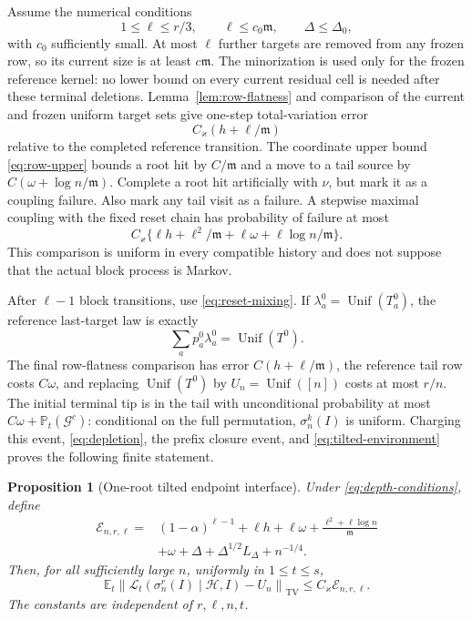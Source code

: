 \documentclass[11pt]{article}
\numberwithin{equation}{section}
\newtheorem{proposition}[theorem]{Proposition}
\theoremstyle{definition}
\theoremstyle{remark}
\newcommand{\E}{\mathbb E}
\newcommand{\Pp}{\mathbb P}
\newcommand{\TV}{\mathrm{TV}}
\newcommand{\Unif}{\operatorname{Unif}}
\newcommand{\cH}{\mathcal H}
\newcommand{\cG}{\mathcal G}
\newcommand{\mres}{\mathfrak m}
\newcommand{\norm}[1]{\left\|#1\right\|}
\begin{document}
Assume the numerical conditions
\begin{equation}\label{eq:depth-conditions}
 1\le\ell\le r/3,\qquad \ell\le c_0\mres,\qquad \Delta\le\Delta_0,
\end{equation}
with $c_0$ sufficiently small. At most $\ell$ further targets are removed
from any frozen row, so its current size is at least $c\mres$. The minorization
is used only for the frozen reference kernel: no lower bound on every current
residual cell is needed after these terminal deletions. Lemma~\ref{lem:row-flatness} and comparison of the current and frozen uniform target sets give one-step total-variation error
\[
 C_\varkappa(h+\ell/\mres)
\]
relative to the completed reference transition. The coordinate upper bound \eqref{eq:row-upper} bounds a root hit by $C/\mres$ and a move to a tail source by $C(\omega+\log n/\mres)$. Complete a root hit artificially with $\nu$, but mark it as a coupling failure. Also mark any tail visit as a failure. A stepwise maximal coupling with the fixed reset chain has probability of failure at most
\begin{equation}\label{eq:terminal-failure}
 C_\varkappa\{\ell h+\ell^2/\mres+\ell\omega+\ell\log n/\mres\}.
\end{equation}
This comparison is uniform in every compatible history and does not suppose that the actual block process is Markov.

After $\ell-1$ block transitions, use \eqref{eq:reset-mixing}. If $\lambda_a^0=\Unif(T_a^0)$, the reference last-target law is exactly
\[
 \sum_a p_a^0\lambda_a^0=\Unif(T^0).
\]
The final row-flatness comparison has error $C(h+\ell/\mres)$, the reference tail row costs $C\omega$, and replacing $\Unif(T^0)$ by $U_n=\Unif([n])$ costs at most $r/n$.
The initial terminal tip is in the tail with unconditional probability at most $C\omega+\Pp_t(\cG^c)$: conditional on the full permutation, $\sigma_n^k(I)$ is uniform. Charging this event, \eqref{eq:depletion}, the prefix closure event, and \eqref{eq:tilted-environment} proves the following finite statement.

\begin{proposition}[One-root tilted endpoint interface]\label{prop:endpoint}
Under \eqref{eq:depth-conditions}, define
\begin{equation}\label{eq:endpoint-error}
 \begin{split}
 \mathcal E_{n,r,\ell}={}&(1-\alpha)^{\ell-1}
 +\ell h+\ell\omega+\frac{\ell^2+\ell\log n}{\mres}\\
 &+\omega+\Delta+\Delta^{1/2}L_\Delta+n^{-1/4}.
 \end{split}
\end{equation}
Then, for all sufficiently large $n$, uniformly in $1\le t\le s$,
\begin{equation}\label{eq:endpoint-TV}
 \E_t\norm{\mathcal L_t(\sigma_n^r(I)\mid\cH,I)-U_n}_{\TV}
 \le C_\varkappa\mathcal E_{n,r,\ell}.
\end{equation}
The constants are independent of $r,\ell,n,t$.
\end{proposition}
\end{document}
